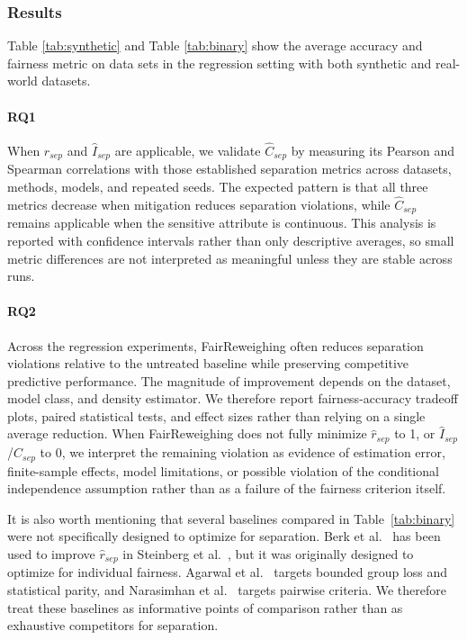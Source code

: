 \subsubsection{Results} 
Table \ref{tab:synthetic} and Table \ref{tab:binary} show the average accuracy and fairness metric on data sets in the regression setting with both synthetic and real-world datasets.

\paragraph{\textbf{RQ1}}
When $\hat{r}_{sep}$ and $\hat{I}_{sep}$ are applicable, we validate $\hat{C}_{sep}$ by measuring its Pearson and Spearman correlations with those established separation metrics across datasets, methods, models, and repeated seeds. The expected pattern is that all three metrics decrease when mitigation reduces separation violations, while $\hat{C}_{sep}$ remains applicable when the sensitive attribute is continuous. This analysis is reported with confidence intervals rather than only descriptive averages, so small metric differences are not interpreted as meaningful unless they are stable across runs.

\paragraph{\textbf{RQ2}}
Across the regression experiments, FairReweighing often reduces separation violations relative to the untreated baseline while preserving competitive predictive performance. The magnitude of improvement depends on the dataset, model class, and density estimator. We therefore report fairness-accuracy tradeoff plots, paired statistical tests, and effect sizes rather than relying on a single average reduction. When FairReweighing does not fully minimize $\hat{r}_{sep}$ to 1, or $\hat{I}_{sep}$/$\hat{C}_{sep}$ to 0, we interpret the remaining violation as evidence of estimation error, finite-sample effects, model limitations, or possible violation of the conditional independence assumption rather than as a failure of the fairness criterion itself.

It is also worth mentioning that several baselines compared in Table~\ref{tab:binary} were not specifically designed to optimize for separation. Berk et al.~\cite{berk2017convex} has been used to improve $\hat{r}_{sep}$ in Steinberg et al.~\cite{steinberg2020fairness}, but it was originally designed to optimize for individual fairness. Agarwal et al.~\cite{agarwal2019fair} targets bounded group loss and statistical parity, and Narasimhan et al.~\cite{narasimhan2020pairwise} targets pairwise criteria. We therefore treat these baselines as informative points of comparison rather than as exhaustive competitors for separation.

